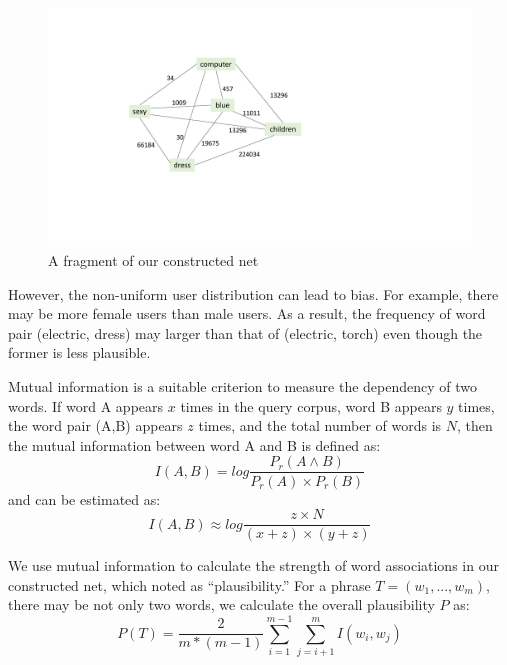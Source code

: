\begin{figure}
	\centering
	\includegraphics[width=0.8\columnwidth]{images/associationNetColor.pdf}
	\caption{A fragment of our constructed net}
	\label{fig:net}
\end{figure}

However, the non-uniform user distribution can lead to bias. For example, there may
be more female users than male users. As a result, the frequency of word pair 
(electric, dress) may larger than that of (electric, torch) even though the former
is less plausible. %

Mutual information is a suitable criterion to measure the dependency of two words. 
If word A appears $x$ times in the query corpus, word B appears $y$ times, 
the word pair (A,B) appears $z$ times, and the total number of words is $N$, then the mutual information between word A and B is defined as:
\begin{equation}
I(A,B) = log\frac{P_r(A\wedge B)}{P_r(A)\times P_r(B)}
\end{equation}
and can be estimated as:%
\begin{equation}
I(A,B) \approx log\frac{z\times N}{(x+z)\times (y+z)}
\end{equation}

We use mutual information to calculate the strength of word associations in 
our constructed net, which noted as ``plausibility.''
For a phrase $T=(w_1, ..., w_m)$, there may be not only two words, we calculate the overall plausibility $P$ as:
\begin{equation}
P(T) = \frac{2}{m*(m-1)}\sum_{i=1}^{m-1}\sum_{j=i+1}^{m}I(w_i, w_j)
\end{equation}

